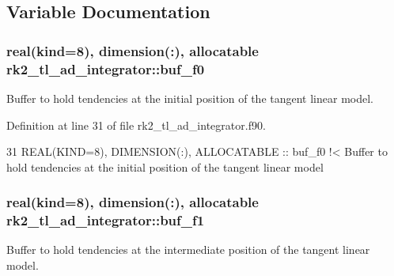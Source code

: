 \subsection{Variable Documentation}
\subsubsection[{\texorpdfstring{buf\+\_\+f0}{buf_f0}}]{\setlength{\rightskip}{0pt plus 5cm}real(kind=8), dimension(\+:), allocatable rk2\+\_\+tl\+\_\+ad\+\_\+integrator\+::buf\+\_\+f0\hspace{0.3cm}{\ttfamily [private]}}\hypertarget{namespacerk2__tl__ad__integrator_ac7b0aea8c2a541e987047da9bc08ff61}{}\label{namespacerk2__tl__ad__integrator_ac7b0aea8c2a541e987047da9bc08ff61}


Buffer to hold tendencies at the initial position of the tangent linear model. 



Definition at line 31 of file rk2\+\_\+tl\+\_\+ad\+\_\+integrator.\+f90.


\begin{DoxyCode}
31   \textcolor{keywordtype}{REAL(KIND=8)}, \textcolor{keywordtype}{DIMENSION(:)}, \textcolor{keywordtype}{ALLOCATABLE} :: buf\_f0\textcolor{comment}{ !< Buffer to hold tendencies at the initial position of
       the tangent linear model}
\end{DoxyCode}
\subsubsection[{\texorpdfstring{buf\+\_\+f1}{buf_f1}}]{\setlength{\rightskip}{0pt plus 5cm}real(kind=8), dimension(\+:), allocatable rk2\+\_\+tl\+\_\+ad\+\_\+integrator\+::buf\+\_\+f1\hspace{0.3cm}{\ttfamily [private]}}\hypertarget{namespacerk2__tl__ad__integrator_a72947f0ba4ce3b9e7877af0e9c4ba13e}{}\label{namespacerk2__tl__ad__integrator_a72947f0ba4ce3b9e7877af0e9c4ba13e}


Buffer to hold tendencies at the intermediate position of the tangent linear model. 



